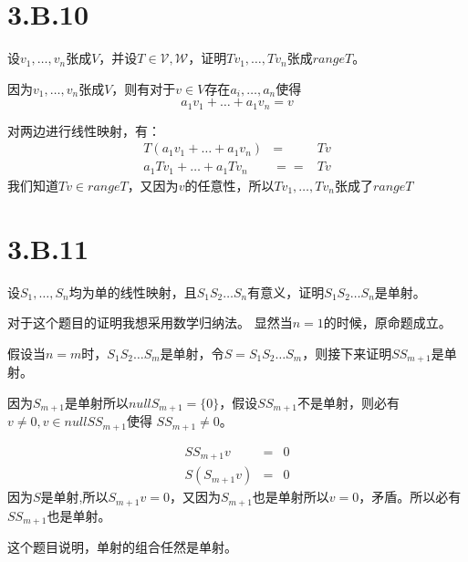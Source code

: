 \documentclass[10pt,a4paper,UTF8]{article}
\begin{document}
\section{3.B.10}
\label{sec:org5979b97}


\begin{problem}
设\(v_{1},\ldots ,v_{n}\)张成\(V\)，并设\(T\in \mathcal{V,W}\)，证明\(Tv_{1},\ldots ,Tv_{n}\)张成\(rangeT\)。
\end{problem}

\begin{answer}
因为\(v_{1},\ldots ,v_{n}\)张成\(V\)，则有对于\(v\in V\)存在\(a_{i},\ldots ,a_{n}\)使得\[a_{1}v_{1} + \ldots + a_{1}v_{n} = v\] 

对两边进行线性映射，有：
\begin{eqnarray*}
T(a_{1}v_{1} + \ldots + a_{1}v_{n})&=& Tv\\
a_{1}Tv_{1} + \ldots + a_{1}Tv_{n} &==&Tv
\end{eqnarray*}
我们知道\(Tv \in rangeT\)，又因为\(v\)的任意性，所以\(Tv_{1},\ldots ,Tv_{n}\)张成了\(range T\)
\end{answer}
\section{3.B.11}
\label{sec:org2f1e5c3}


\begin{problem}
设\(S_{1},\ldots ,S_{n}\)均为单的线性映射，且\(S_{1}S_{2}\ldots S_{n}\)有意义，证明\(S_{1}S_{2}\ldots S_{n}\)是单射。
\end{problem}

\begin{answer}
对于这个题目的证明我想采用数学归纳法。
显然当\(n=1\)的时候，原命题成立。

假设当\(n=m\)时，\(S_{1}S_{2}\ldots S_{m}\)是单射，令\(S=S_{1}S_{2}\ldots S_{m}\)，则接下来证明\(SS_{m+1}\)是单射。

因为\(S_{m+1}\)是单射所以\(nullS_{m+1}=\{0\}\)，假设\(SS_{m+1}\)不是单射，则必有\(v\neq 0, v\in nullSS_{m+1}\)使得 \(SS_{m+1} \neq 0\)。

\begin{eqnarray}
\label{eq:2}
SS_{m+1}v &=& 0 \\
S(S_{m+1}v) &=& 0
\end{eqnarray}
因为\(S\)是单射,所以\(S_{m+1}v = 0\)，又因为\(S_{m+1}\)也是单射所以\(v=0\)，矛盾。所以必有\(SS_{m+1}\)也是单射。


这个题目说明，单射的组合任然是单射。
\end{answer}
\end{document}
